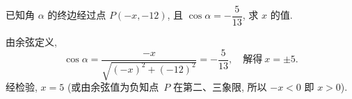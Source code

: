 \begin{example}
    已知角 $\alpha$ 的终边经过点 $P(-x,-12)$, 
    且 $\cos\alpha=-\dfrac5{13}$, 求 $x$ 的值.
\end{example}
\begin{solution}
    由余弦定义, 
    \[\cos\alpha= \frac{-x}{\sqrt{(-x)^2+(-12)^2}}= -\frac5{13},\quad
    \text{解得}\ x=\pm5.\]
    经检验, $x=5$  (或由余弦值为负知点~$P$ 在第二、三象限, 所以 $-x<0$ 即 $x>0$).
\end{solution}